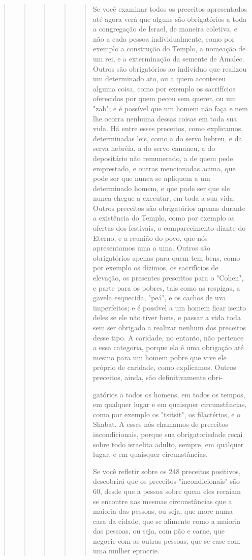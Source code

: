 \begin{quote}
\begin{quote}
\begin{quote}
\begin{quote}
\begin{quote}
Se você examinar todos os preceitos apresentados até agora verá que
alguns são obrigatórios a toda a congregação de Israel, de maneira
coletiva, e não a cada pessoa individualmente, como por exemplo a
construção do Tem­plo, a nomeação de um rei, e a exterminação da semente
de Amalec. Outros são obrigatórios ao indivíduo que realizou um
determinado ato, ou a quem acon­teceu alguma coisa, como por exemplo os
sacrifícios oferecidos por quem pe­cou sem querer, ou um "zab"; e é
possível que um homem não faça e nem lhe ocorra nenhuma dessas coisas em
toda sua vida. Há entre esses preceitos, como explicamos, determinadas
leis, como a do servo hebreu, e da serva he­bréia, a do servo cananeu, a
do depositário não remunerado, a de quem pede emprestado, e outras
mencionadas acima, que pode ser que nunca se apliquem a um determinado
homem, e que pode ser que ele nunca chegue a executar, em toda a sua
vida. Outros preceitos são obrigatórios apenas durante a existên­cia do
Templo, como por exemplo as ofertas dos festivais, o comparecimento
diante do Eterno, e a reunião do povo, que nós apresentamos uma a uma.
Ou­tros são obrigatórios apenas para quem tem bens, como por exemplo os
dízi­mos, os sacrifícios de elevação, os presentes prescritos para o
"Cohen", e par­te para os pobres, tais como as respigas, a gavela
esquecida, "peá", e os cachos de uva imperfeitos; e é possível a um
homem ficar isento deles se ele não tiver bens, e passar a vida toda sem
ser obrigado a realizar nenhum dos preceitos desse tipo. A caridade, no
entanto, não pertence a essa categoria, porque ela é uma obrigação até
mesmo para um homem pobre que vive ele próprio de caridade, como
explicamos. Outros preceitos, ainda, são definitivamente obri-



gatórios a todos os homens, em todos os tempos, em qualquer lugar e em
quais­quer circunstâncias, como por exemplo os "tsitsit", os
filactérios, e o Shabat. A esses nós chamamos de preceitos
incondicionais, porque sua obrigatorieda­de recai sobre todo israelita
adulto, sempre, em qualquer lugar, e em quaisquer circunstâncias.

Se você refletir sobre os 248 preceitos positivos, descobrirá que os
preceitos "incondicionais" são 60, desde que a pessoa sobre quem eles
recaiam se encontre nas mesmas circunstâncias que a maioria das pessoas,
ou seja, que more numa casa da cidade, que se alimente como a maioria
das pessoas, ou seja, com pão e carne, que negocie com as outras
pessoas, que se case com uma mulher eprocrie.


\end{quote}
\end{quote}
\end{quote}
\end{quote}
\end{quote}
